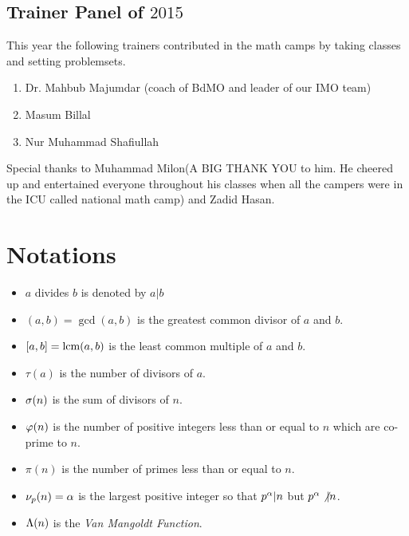 \documentclass{subfile}
\begin{document}
	\newpage
	\section*{Trainer Panel of $2015$}
	This year the following trainers contributed in the math camps by taking classes and setting problemsets.
	
	\begin{enumerate}
		\item Dr. Mahbub Majumdar (coach of BdMO and leader of our IMO team)
		\item Masum Billal
		\item Nur Muhammad Shafiullah
	\end{enumerate}
	Special thanks to Muhammad Milon(A BIG THANK YOU to him. He cheered up and entertained everyone throughout his classes when all the campers were in the ICU called national math camp) and Zadid Hasan.
	\tableofcontents
	
	\chapter*{Notations}
	
	\begin{itemize}
		\item $a$ divides $b$ is denoted by $a|b$
		\item $(a,b)=\gcd(a,b)$ is the greatest common divisor of $a$ and $b$.
		\item $[a,b]=\mbox{lcm}(a,b)$ is the least common multiple of $a$ and $b$.
		\item $\tau(a)$ is the number of divisors of $a$.
		\item $\sigma (n)$ is the sum of divisors of $n$.
		\item $\varphi (n)$ is the number of positive integers less than or equal to $n$ which are co-prime to $n$.
		\item $\pi(n)$ is the number of primes less than or equal to $n$.
		\item $\nu_p(n)=\alpha$ is the largest positive integer so that $p^\alpha|n$ but $p^\alpha\not|n$.
		\item $\Lambda(n)$ is the \textit{Van Mangoldt Function}.
	\end{itemize}
\end{document}
